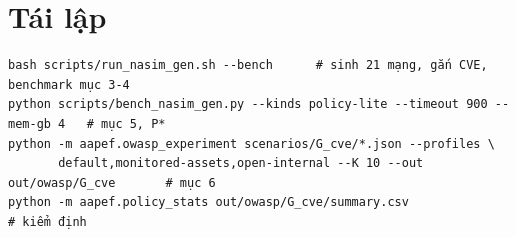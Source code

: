 \documentclass[11pt,a4paper]{article}
\begin{document}
\section{Tái lập}

{\small
\begin{verbatim}
bash scripts/run_nasim_gen.sh --bench      # sinh 21 mạng, gắn CVE, benchmark mục 3-4
python scripts/bench_nasim_gen.py --kinds policy-lite --timeout 900 --mem-gb 4   # mục 5, P*
python -m aapef.owasp_experiment scenarios/G_cve/*.json --profiles \
       default,monitored-assets,open-internal --K 10 --out out/owasp/G_cve       # mục 6
python -m aapef.policy_stats out/owasp/G_cve/summary.csv                         # kiểm định
\end{verbatim}
}
\end{document}
